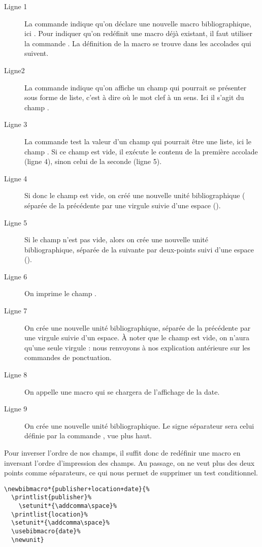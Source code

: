\begin{description}
\item[Ligne 1]La commande  indique qu'on déclare une nouvelle macro bibliographique, ici . Pour indiquer qu'on redéfinit une macro déjà existant, il faut utiliser la commande . La définition de la macro se trouve dans les accolades qui suivent.
\item[Ligne2]La commande  indique qu'on affiche un champ qui pourrait se présenter sous forme de liste, c'est à dire où le mot clef  à un sens. Ici il s'agit du champ . \item[Ligne 3]La commande  test la valeur d'un champ qui pourrait être une liste, ici le champ . Si ce champ est vide, il exécute le contenu de la première accolade (ligne 4), sinon celui de la seconde (ligne 5).
\item[Ligne 4]Si donc le champ  est vide, on créé une nouvelle unité bibliographique ( séparée de la précédente par une virgule suivie d'une espace ().
\item[Ligne 5]Si le champ  n'est pas vide, alors on crée une nouvelle unité bibliographique, séparée de la suivante par deux-points suivi d'une espace ().
\item[Ligne 6]On imprime le champ .
\item[Ligne 7]On crée une nouvelle unité bibliographique, séparée de la précédente par une virgule suivie d'un espace. À noter que le champ  est vide, on n'aura qu'une seule virgule : nous renvoyons à nos explication antérieure sur les commandes de ponctuation.
\item[Ligne 8]On appelle une macro qui se chargera de l'affichage de la date.
\item[Ligne 9]On crée une nouvelle unité bibliographique. Le signe séparateur sera celui définie par la commande , vue plus haut.
\end{description}

Pour inverser l'ordre de nos champs, il suffit donc de redéfinir une macro en inversant l'ordre d'impression des champs. Au passage, on ne veut plus des deux points comme séparateurs, ce qui nous permet de supprimer un test conditionnel.


\begin{verbatim}
\newbibmacro*{publisher+location+date}{%
  \printlist{publisher}%
    \setunit*{\addcomma\space}%
  \printlist{location}%
  \setunit*{\addcomma\space}%
  \usebibmacro{date}%
  \newunit}
\end{verbatim}

